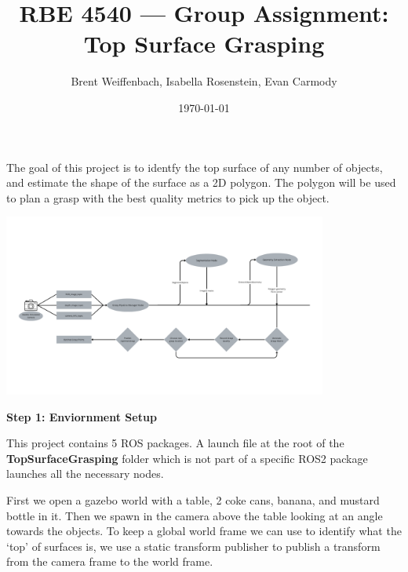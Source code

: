 \documentclass[12pt]{article}
\title{RBE 4540 --- Group Assignment: Top Surface Grasping}
\author{Brent Weiffenbach, Isabella Rosenstein, Evan Carmody}
\date{\today}
\begin{document}
\maketitle

The goal of this project is to identfy the top surface of any number of objects, and estimate the shape of the surface as a 2D polygon. The polygon will be used to plan a grasp with the best quality metrics to pick up the object.

\begin{center}
	\includegraphics[width=0.8\textwidth]{TopGraspingArchiteture.png}
\end{center}

\vspace{0.3cm}

\textbf{Step 1: Enviornment Setup}

This project contains 5 ROS packages. A launch file at the root of the \textbf{TopSurfaceGrasping} folder which is not part of a specific ROS2 package launches all the necessary nodes. 

First we open a gazebo world with a table, 2 coke cans, banana, and mustard bottle in it. Then we spawn in the camera above the table looking at an angle towards the objects. To keep a global world frame we can use to identify what the `top' of surfaces is, we use a static transform publisher to publish a transform from the camera frame to the world frame.
\end{document}
